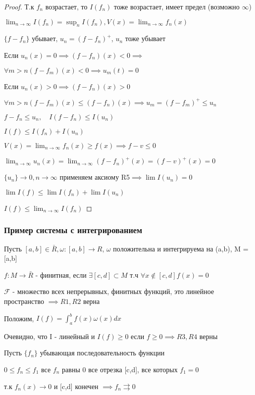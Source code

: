 \documentclass[a4paper]{article}
\theoremstyle{definition}
\theoremstyle{remark}
\begin{document}
\begin{proof}
     Т.к $f_n$ возрастает, то $I(f_n)$ тоже возрастает, имеет предел (возможно $\infty$)

     $\lim_{n\to\infty}I(f_n)=\sup_{n}I(f_n), V(x) = \lim_{n\to\infty}f_n(x)$

     $\{f-f_n\}$ убывает, $u_n = (f-f_n)^+$, $u_n$ тоже убывает

     Если $u_n(x)=0\implies (f-f_n)(x)<0\implies$

     $\forall m>n (f-f_m)(x)< 0\implies u_m(t) = 0$

     Если $u_n(x)>0\implies (f-f_n)(x)>0$

     $\forall m > n (f-f_m)(x)\leq (f-f_n)(x)\implies u_m = (f-f_m)^+\leq u_n$

     $f - f_n\leq u_n, \quad I(f-f_n)\leq I(u_n)$

     $I(f)\leq I(f_n)+I(u_n)$

     $V(x) = \lim_{n\to\infty}f_n(x)\geq f(x)\implies f-v\leq 0$

     $\lim_{n\to\infty}u_n(x) = \lim_{n\to\infty}(f-f_n)^+(x) = (f - v)^+(x) = 0$

     $\{u_n\}\to 0, n\to \infty$ применяем аксиому R5$\implies\lim I(u_n) = 0$

     $\lim I(f)\leq \lim I(f_n) + \lim I(u_n)$

     $I(f)\leq \lim_{n\to\infty}I(f_n)$
\end{proof}

\subsubsection{Пример системы с интегрированием}
Пусть $[a,b]\in \bar{R}, \omega: [a,b]\to R $, $\omega $ положительна и интегрируема на (a,b), M = [a,b]

$f: M \to \bar{R}$ -  финитная, если $\exists [c,d]\subset M$ т.ч $\forall x\notin [c,d] f(x) = 0$

$\mathcal{F}$ -  множество всех непрерывных, финитных функций, это линейное пространство $\implies R1, R2$ верна 

Положим, $I(f) = \int_a^b f(x)\omega(x)dx$

Очевидно, что I - линейный и $I(f)\geq 0$ если $f\geq 0\implies R3, R4$ верны

Пусть $\{f_n\}$ убывающая последовательность функции 

$0 \leq f_n \leq f_1 $ все $f_n$ равны 0 все отрезка [c,d], все которых $f_1  = 0$

т.к $f_n(x )\to 0$ и [c,d] конечен $\implies f_n\rightrightarrows 0$
\end{document}

